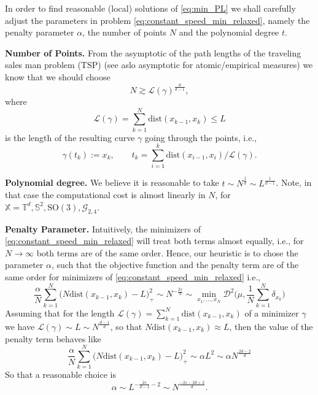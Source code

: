 \documentclass[draft,
a4paper,11pt,DIV=11,%
abstract=on%
]{scrartcl}
\begin{document}
In order to find reasonable (local) solutions of \eqref{eq:min_PL} we shall carefully adjust the parameters in problem \eqref{eq:constant_speed_min_relaxed}, namely the penalty parameter $\alpha$, the number of points $N$ and the polynomial degree $t$.

\textbf{Number of Points.}
From the asymptotic of the path lengths of the traveling sales man problem (TSP) {\color{blue}(see aslo asymptotic for atomic/empirical measures)}
we know that we should choose
\[
  N \gtrsim \mathcal L(\gamma)^{\frac{d}{d-1}},
\]
where
\[
  \mathcal L(\gamma) = \sum_{k=1}^{N} \mathrm{dist}(x_{k-1},x_{k}) \le L
\]
is the length of the resulting curve $\gamma$ going through the points, i.e.,
\[
 \gamma(t_{k}) := x_{k}, \qquad t_{k} = \sum_{i=1}^{k}  \mathrm{dist}(x_{i-1},x_{i})/ \mathcal L(\gamma).
\]


\textbf{Polynomial degree.} We believe it is reasonable to take $t \sim N^{\frac1d} \sim L^{\frac{1}{d-1}}$. Note, in that case the computational cost is almost linearly in $N$, for $\mathbb X = \mathbb T^{d}, \mathbb S^{2}, \mathrm{SO(3)}, \mathcal G_{2,4}$.

\textbf{Penalty Parameter.}
Intuitively, the minimizers of \eqref{eq:constant_speed_min_relaxed} will treat both terms almost equally, i.e., for $N\to \infty$ both terms are of the same order. Hence, our heuristic is to chose the parameter $\alpha$, such that the objective function and the penalty term are of the same order for minimizers of \eqref{eq:constant_speed_min_relaxed} i.e.,
\begin{equation}
  \label{eq:penalty_behavior}
  \frac{\alpha}{N} \sum_{k=1}^{N} \big(N \mathrm{dist}(x_{k-1},x_{k}) - L \big)_{+}^{2} \sim N^{-\frac{2s}{d}} \sim
  \min_{x_{1},\dots,x_{N}} \mathscr{D}^{2} \Big(\mu, \frac{1}{N} \sum_{k=1}^{N} \delta_{x_{k}}\Big) 
\end{equation}
Assuming that for the length $\mathcal L(\gamma) = \sum_{k=1}^{N}\mathrm{dist}(x_{k-1},x_{k})$ of a minimizer $\gamma$ we have $\mathcal L(\gamma) \sim L \sim N^{\frac{d-1}{d}}$, so that $N \mathrm{dist}(x_{k-1},x_{k}) \approx L$, then the value of the penalty term behaves like
\[
  \frac{\alpha}{N} \sum_{k=1}^{N} \big(N \mathrm{dist}(x_{k-1},x_{k}) - L \big)_{+}^{2} \sim  \alpha L^{2} \sim \alpha N^{\frac{2d-2}{d}}
\]
So that a reasonable choice is
\[
  \alpha \sim L^{-\frac{2s}{d-1}-2} \sim N^{\frac{-2s-2d+2}{d}}.
\]
\end{document}
